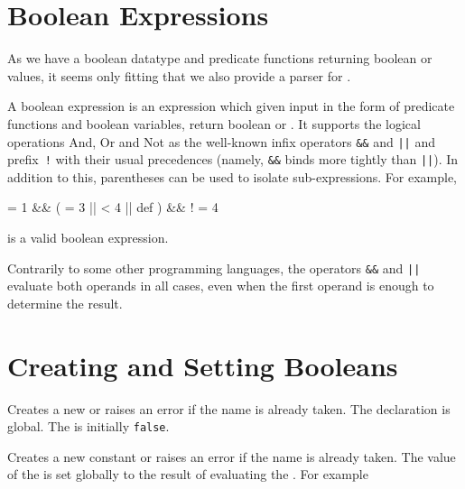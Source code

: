 \documentclass[oneside]{book}
\begin{document}
\section{Boolean Expressions}

As we have a boolean datatype and predicate functions returning
boolean  or  values, it seems only fitting
that we also provide a parser for .

A boolean expression is an expression which given input in the form
of predicate functions and boolean variables, return boolean
 or . It supports the logical operations And,
Or and Not as the well-known infix operators \verb|&&| and \verb"||" and
prefix~\verb|!| with their usual precedences (namely, \verb|&&| binds
more tightly than \verb"||"). In addition to this, parentheses can be
used to isolate sub-expressions. For example,
\begin{codehigh}
 = {1} &&
  (
     = {3} ||
     < {4} ||
     {def}
  ) &&
!  = {4}
\end{codehigh}
is a valid boolean expression.

Contrarily to some other programming languages, the operators \verb|&&| and
\verb"||" evaluate both operands in all cases, even when the first
operand is enough to determine the result.

\section{Creating and Setting Booleans}

\begin{function}{\boolNew}
\begin{syntax}
 
\end{syntax}
Creates a new  or raises an error if the
name is already taken. The declaration is global. The
 is initially \texttt{false}.
\end{function}

\begin{function}{\boolConst}
\begin{syntax}
  
\end{syntax}
Creates a new constant  or raises an error if the name
is already taken. The value of the  is set globally to
the result of evaluating the .
For example
\begin{codehigh}
\boolConst {}
\boolVarLog \cFooSomeBool
\end{codehigh}
\end{function}
\end{document}

